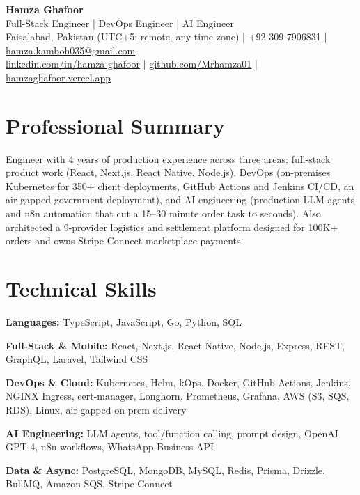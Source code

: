 \documentclass[letterpaper,10pt]{article}
\begin{document}
\begin{center}
  {\LARGE\bfseries Hamza Ghafoor}\\[3pt]
  {\large Full-Stack Engineer | DevOps Engineer | AI Engineer}\\[3pt]
  Faisalabad, Pakistan (UTC+5; remote, any time zone) | +92 309 7906831 | \href{mailto:hamza.kamboh035@gmail.com}{hamza.kamboh035@gmail.com}\\[1pt]
  \href{https://linkedin.com/in/hamza-ghafoor}{linkedin.com/in/hamza-ghafoor} |
  \href{https://github.com/Mrhamza01}{github.com/Mrhamza01} |
  \href{https://hamzaghafoor.vercel.app}{hamzaghafoor.vercel.app}
\end{center}
\vspace{-6pt}

\section{Professional Summary}
Engineer with 4 years of production experience across three areas: full-stack product work (React, Next.js,
React Native, Node.js), DevOps (on-premises Kubernetes for 350+ client deployments, GitHub Actions and Jenkins
CI/CD, an air-gapped government deployment), and AI engineering (production LLM agents and n8n automation
that cut a 15--30 minute order task to seconds). Also architected a 9-provider logistics and settlement
platform designed for 100K+ orders and owns Stripe Connect marketplace payments.

\section{Technical Skills}
\textbf{Languages:} TypeScript, JavaScript, Go, Python, SQL\par
\textbf{Full-Stack \& Mobile:} React, Next.js, React Native, Node.js, Express, REST, GraphQL, Laravel, Tailwind CSS\par
\textbf{DevOps \& Cloud:} Kubernetes, Helm, kOps, Docker, GitHub Actions, Jenkins, NGINX Ingress, cert-manager,
Longhorn, Prometheus, Grafana, AWS (S3, SQS, RDS), Linux, air-gapped on-prem delivery\par
\textbf{AI Engineering:} LLM agents, tool/function calling, prompt design, OpenAI GPT-4, n8n workflows,
WhatsApp Business API\par
\textbf{Data \& Async:} PostgreSQL, MongoDB, MySQL, Redis, Prisma, Drizzle, BullMQ, Amazon SQS, Stripe Connect
\end{document}
